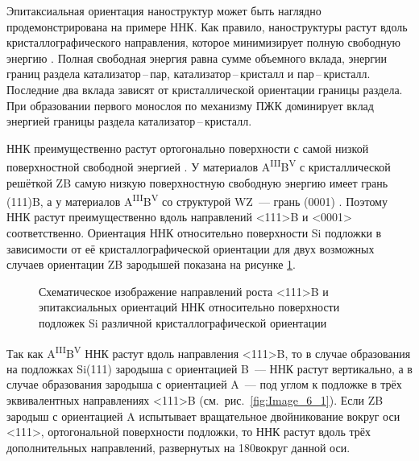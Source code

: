 Эпитаксиальная ориентация наноструктур может быть наглядно продемонстрирована на примере ННК. Как правило, наноструктуры растут вдоль кристаллографического направления, которое минимизирует полную свободную энергию \cite{Wagner1964}. Полная свободная энергия равна сумме объемного вклада, энергии границ раздела катализатор\,--\,пар, катализатор\,--\,кристалл и пар\,--\,кристалл. Последние два вклада зависят от кристаллической ориентации границы раздела. При образовании первого монослоя по механизму ПЖК доминирует вклад энергией границы раздела катализатор\,--\,кристалл.

ННК преимущественно растут ортогонально поверхности с самой низкой поверхностной свободной энергией \cite{Wagner1964}. У материалов A\textsuperscript{III}B\textsuperscript{V} с кристаллической решёткой ZB самую низкую поверхностную свободную энергию имеет грань (111)B, а у материалов A\textsuperscript{III}B\textsuperscript{V} со структурой WZ~--- грань (0001) \cite{Fortuna2010}. Поэтому ННК растут преимущественно вдоль направлений <111>B и <0001> соответственно. Ориентация ННК относительно поверхности Si подложки в зависимости от её кристаллографической ориентации для двух возможных случаев ориентации ZB зародышей показана на рисунке \cref{fig:Image_6}.

\begin{figure}[ht]
	\caption{Схематическое изображение направлений роста <111>B и эпитаксиальных ориентаций ННК относительно поверхности подложек Si различной кристаллографической ориентации}\label{fig:Image_6}
\end{figure}

Так как A\textsuperscript{III}B\textsuperscript{V} ННК растут вдоль направления <111>B, то в случае образования на подложках Si(111) зародыша с ориентацией B~--- ННК растут вертикально, а в случае образования зародыша с ориентацией A~--- под углом к подложке в трёх эквивалентных направлениях <111>B (см.~рис.~\cref{fig:Image_6_1}). Если ZB зародыш с ориентацией A испытывает вращательное двойникование вокруг оси <111>, ортогональной поверхности подложки, то ННК растут вдоль трёх дополнительных направлений, развернутых на 180\textdegree вокруг данной оси.

